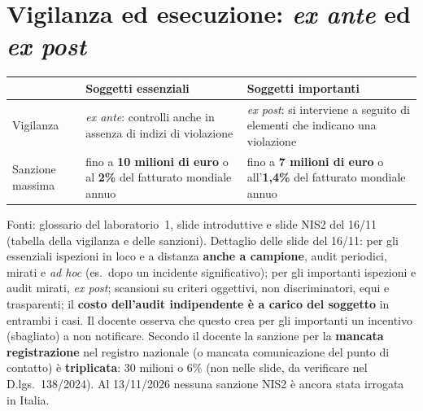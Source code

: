 \section{Vigilanza ed esecuzione: \emph{ex ante} ed \emph{ex post}}
\label{sec:nis2-vigilanza}

\begin{center}
\small
\begin{tabularx}{\linewidth}{>{\raggedright\arraybackslash}p{3cm} X X}
\toprule
 & \textbf{Soggetti essenziali} & \textbf{Soggetti importanti} \\ \midrule
Vigilanza & \emph{ex ante}: controlli anche in assenza di indizi di violazione
  & \emph{ex post}: si interviene a seguito di elementi che indicano una violazione \\
Sanzione massima & fino a \textbf{10 milioni di euro} o al \textbf{2\%} del fatturato mondiale annuo
  & fino a \textbf{7 milioni di euro} o all'\textbf{1,4\%} del fatturato mondiale annuo \\
\bottomrule
\end{tabularx}
\end{center}
\noindent Fonti: glossario del laboratorio~1, slide introduttive e slide NIS2 del 16/11 (tabella della
vigilanza e delle sanzioni). Dettaglio delle slide del 16/11: per gli essenziali ispezioni in loco e a
distanza \textbf{anche a campione}, audit periodici, mirati e \emph{ad hoc} (es.\ dopo un incidente
significativo); per gli importanti ispezioni e audit mirati, \emph{ex post}; scansioni su criteri
oggettivi, non discriminatori, equi e trasparenti; il \textbf{costo dell'audit indipendente è a carico
del soggetto} in entrambi i casi. Il docente osserva che questo crea per gli importanti un incentivo
(sbagliato) a non notificare. Secondo il docente la sanzione per la \textbf{mancata registrazione} nel
registro nazionale (o mancata comunicazione del punto di contatto) è \textbf{triplicata}: 30 milioni o
6\% (non nelle slide, da verificare nel D.lgs.~138/2024). Al 13/11/2026 nessuna sanzione NIS2 è ancora
stata irrogata in Italia.

